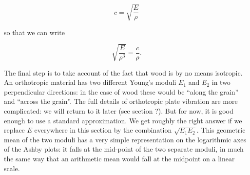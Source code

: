   $$c=\sqrt{\dfrac{E}{\rho}}\tag{5}$$ 

  so that we can write 

  $$ \sqrt{\dfrac{E}{\rho^3}} = \dfrac{c}{\rho}. \tag{6}$$ 

  The final step is to take account of the fact that wood is by no means 
  isotropic. An orthotropic material has two different Young's moduli $E_1$ and 
  $E_2$ in two perpendicular directions: in the case of wood these would be 
  ``along the grain'' and ``across the grain''. The full details of orthotropic 
  plate vibration are more complicated: we will return to it later (see section 
  ?). But for now, it is good enough to use a standard approximation. We get 
  roughly the right answer if we replace $E$ everywhere in this section by the 
  combination $\sqrt{E_1E_2}$. This geometric mean of the two moduli has a very 
  simple representation on the logarithmic axes of the Ashby plots: it falls at 
  the mid-point of the two separate moduli, in much the same way that an 
  arithmetic mean would fall at the midpoint on a linear scale. 